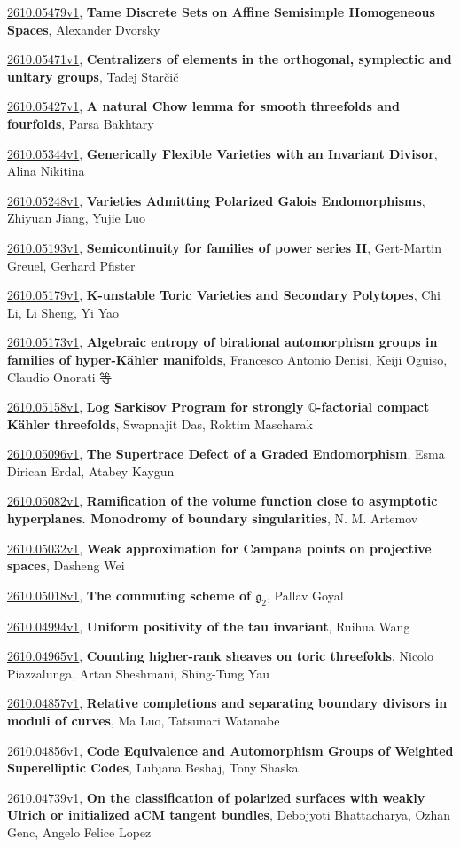 \documentclass[9pt, a4paper]{article}
\theoremstyle{plain}
\theoremstyle{definition}
\theoremstyle{remark}
\newcommand{\arxiv}[3]{\href{https://arxiv.org/abs/#1}{#1}, \textbf{\textcolor{arxivblue}{#2}}, #3}
\begin{document}
\arxiv{2610.05479v1}{Tame Discrete Sets on Affine Semisimple Homogeneous Spaces}{Alexander Dvorsky}

\arxiv{2610.05471v1}{Centralizers of elements in the orthogonal, symplectic and unitary groups}{Tadej Starčič}

\arxiv{2610.05427v1}{A natural Chow lemma for smooth threefolds and fourfolds}{Parsa Bakhtary}

\arxiv{2610.05344v1}{Generically Flexible Varieties with an Invariant Divisor}{Alina Nikitina}

\arxiv{2610.05248v1}{Varieties Admitting Polarized Galois Endomorphisms}{Zhiyuan Jiang, Yujie Luo}

\arxiv{2610.05193v1}{Semicontinuity for families of power series II}{Gert-Martin Greuel, Gerhard Pfister}

\arxiv{2610.05179v1}{K-unstable Toric Varieties and Secondary Polytopes}{Chi Li, Li Sheng, Yi Yao}

\arxiv{2610.05173v1}{Algebraic entropy of birational automorphism groups in families of hyper-Kähler manifolds}{Francesco Antonio Denisi, Keiji Oguiso, Claudio Onorati 等}

\arxiv{2610.05158v1}{Log Sarkisov Program for strongly $\mathbb{Q}$-factorial compact Kähler threefolds}{Swapnajit Das, Roktim Mascharak}

\arxiv{2610.05096v1}{The Supertrace Defect of a Graded Endomorphism}{Esma Dirican Erdal, Atabey Kaygun}

\arxiv{2610.05082v1}{Ramification of the volume function close to asymptotic hyperplanes. Monodromy of boundary singularities}{N. M. Artemov}

\arxiv{2610.05032v1}{Weak approximation for Campana points on projective spaces}{Dasheng Wei}

\arxiv{2610.05018v1}{The commuting scheme of $\mathfrak{g}_2$}{Pallav Goyal}

\arxiv{2610.04994v1}{Uniform positivity of the tau invariant}{Ruihua Wang}

\arxiv{2610.04965v1}{Counting higher-rank sheaves on toric threefolds}{Nicolo Piazzalunga, Artan Sheshmani, Shing-Tung Yau}

\arxiv{2610.04857v1}{Relative completions and separating boundary divisors in moduli of curves}{Ma Luo, Tatsunari Watanabe}

\arxiv{2610.04856v1}{Code Equivalence and Automorphism Groups of Weighted Superelliptic Codes}{Lubjana Beshaj, Tony Shaska}

\arxiv{2610.04739v1}{On the classification of polarized surfaces with weakly Ulrich or initialized aCM tangent bundles}{Debojyoti Bhattacharya, Ozhan Genc, Angelo Felice Lopez}
\end{document}
